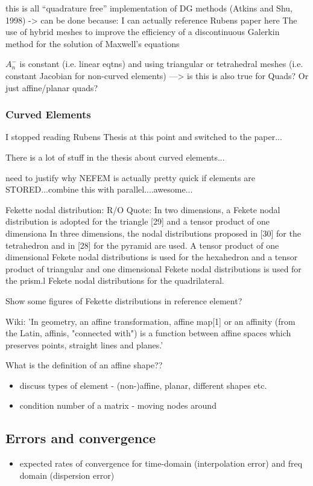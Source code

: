 this is all ``quadrature free'' implementation of DG methods (Atkins and Shu,
1998) -> can be done because: I can actually reference Rubens paper here
The use of hybrid meshes to improve the efficiency of a discontinuous Galerkin
method for the solution of Maxwell's equations

$A_n^-$ is constant (i.e. linear eqtns) and
using triangular or tetrahedral meshes (i.e. constant Jacobian for non-curved
elements)
---> is this is also true for Quads? Or just affine/planar quads?

\subsubsection{Curved Elements}

I stopped reading Rubens Thesis at this point and switched to the paper...

There is a lot of stuff in the thesis about curved elements...

need to justify why NEFEM is actually pretty quick if elements are
STORED...combine this with parallel....awesome...

Fekette nodal distribution:
R/O Quote: In two dimensions, a Fekete nodal distribution is adopted for the triangle
[29] and a tensor product of one dimensiona In three dimensions, the nodal distributions proposed in [30] for the tetrahedron and
in [28] for the pyramid are used. A tensor product of one dimensional Fekete
nodal distributions is used for the hexahedron and a tensor product of triangular
and one dimensional Fekete nodal distributions is used for the prism.l Fekete nodal distributions for the quadrilateral.

Show some figures of Fekette distributions in reference element?

Wiki: 'In geometry, an affine transformation, affine map[1] or an affinity (from the Latin, affinis, "connected with") is a function between affine spaces which preserves points, straight lines and planes.'

What is the definition of an affine shape??




\begin{itemize}
	\item discuss types of element - (non-)affine, planar, different shapes etc.
	\item condition number of a matrix - moving nodes around %
\end{itemize}

\subsection{Errors and convergence}
\begin{itemize}
  \item expected rates of convergence for time-domain (interpolation error) and freq domain (dispersion error)
\end{itemize}

